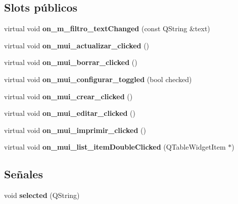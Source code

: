 \subsection*{Slots p\'{u}blicos}
\begin{CompactItemize}
\item 
virtual void {\bf on\_\-m\_\-filtro\_\-text\-Changed} (const QString \&text)\label{classPresupuestoList_i0}

\item 
virtual void {\bf on\_\-mui\_\-actualizar\_\-clicked} ()\label{classPresupuestoList_i1}

\item 
virtual void {\bf on\_\-mui\_\-borrar\_\-clicked} ()\label{classPresupuestoList_i2}

\item 
virtual void {\bf on\_\-mui\_\-configurar\_\-toggled} (bool checked)\label{classPresupuestoList_i3}

\item 
virtual void {\bf on\_\-mui\_\-crear\_\-clicked} ()\label{classPresupuestoList_i4}

\item 
virtual void {\bf on\_\-mui\_\-editar\_\-clicked} ()\label{classPresupuestoList_i5}

\item 
virtual void {\bf on\_\-mui\_\-imprimir\_\-clicked} ()\label{classPresupuestoList_i6}

\item 
virtual void {\bf on\_\-mui\_\-list\_\-item\-Double\-Clicked} (QTable\-Widget\-Item $\ast$)\label{classPresupuestoList_i7}

\end{CompactItemize}
\subsection*{Se\~{n}ales}
\begin{CompactItemize}
\item 
void {\bf selected} (QString)\label{classPresupuestoList_l0}

\end{CompactItemize}
